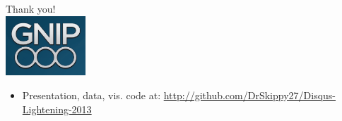 \documentclass{beamer}
\begin{document}
\begin{frame}
  \begin{center}
    {\Large Thank you!}  \\ [20pt]
    \includegraphics[width=3cm]{./imgs/logo.png} \\ [15pt]
    \begin{itemize}
    \item Presentation, data, vis. code at: \url{http://github.com/DrSkippy27/Disqus-Lightening-2013}
    \end{itemize}
  \end{center}
\end{frame}
\end{document}
